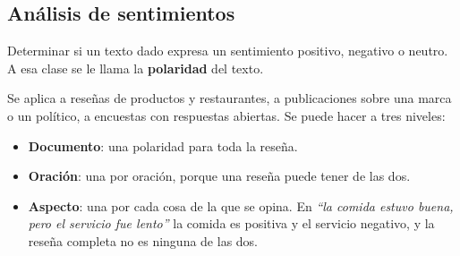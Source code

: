 \documentclass[11pt,letterpaper]{article}
\begin{document}

\subsection*{Análisis de sentimientos}

\begin{definicion}
    Determinar si un texto dado expresa un sentimiento positivo,
    negativo o neutro. A esa clase se le llama la \textbf{polaridad}
    del texto.
\end{definicion}

Se aplica a reseñas de productos y restaurantes, a publicaciones sobre
una marca o un político, a encuestas con respuestas abiertas. Se puede
hacer a tres niveles:

\begin{itemize}[itemsep=0.3em]
    \item \textbf{Documento}: una polaridad para toda la reseña.
    \item \textbf{Oración}: una por oración, porque una reseña puede
          tener de las dos.
    \item \textbf{Aspecto}: una por cada cosa de la que se opina. En
          \textit{``la comida estuvo buena, pero el servicio fue
          lento''} la comida es positiva y el servicio negativo, y la
          reseña completa no es ninguna de las dos.
\end{itemize}
\end{document}
